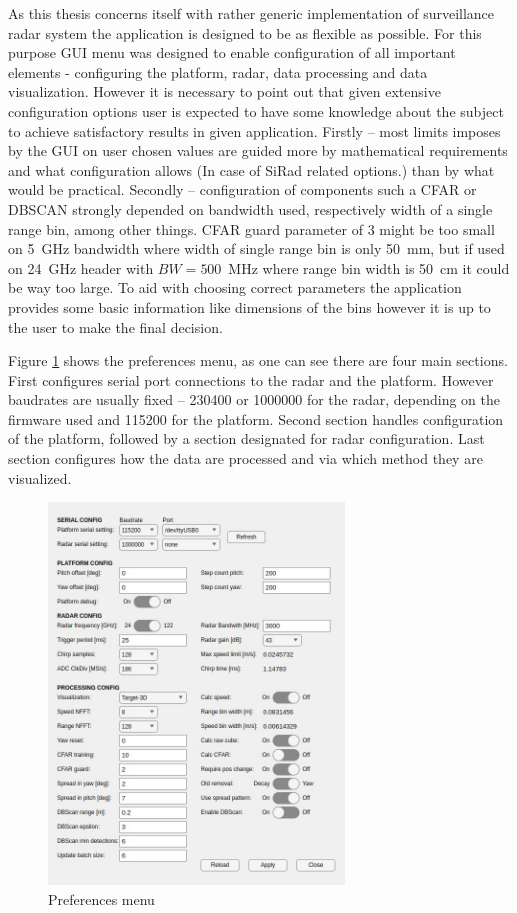 As this thesis concerns itself with rather generic implementation of surveillance radar system the application is designed to be as flexible as possible.
For this purpose GUI menu was designed to enable configuration of all important elements - configuring the platform, radar, data processing and data visualization.
However it is necessary to point out that given extensive configuration options user is expected to have some knowledge about the subject to achieve satisfactory results in given application.
Firstly -- most limits imposes by the GUI on user chosen values are guided more by mathematical requirements and what configuration allows (In case of SiRad related options.) than by what would be practical.
Secondly -- configuration of components such a CFAR or DBSCAN strongly depended on bandwidth used, respectively width of a single range bin, among other things.
CFAR guard parameter of 3 might be too small on 5~GHz bandwidth where width of single range bin is only 50~mm, but if used on 24~GHz header with $BW=500$~MHz where range bin width is 50~cm it could be way too large.
To aid with choosing correct parameters the application provides some basic information like dimensions of the bins however it is up to the user to make the final decision.

Figure \ref{fig:preferences} shows the preferences menu, as one can see there are four main sections.
First configures serial port connections to the radar and the platform.
However baudrates are usually fixed  -- 230400 or 1000000 for the radar, depending on the firmware used and 115200 for the platform.
Second section handles configuration of the platform, followed by a section designated for radar configuration.
Last section configures how the data are processed and via which method they are visualized.

\begin{figure}[h!]
  \centering
  \includegraphics[width=0.7\textwidth]{../img/preferences.jpg}
  \caption[Preferences menu]{Preferences menu}
  \label{fig:preferences}
\end{figure}

